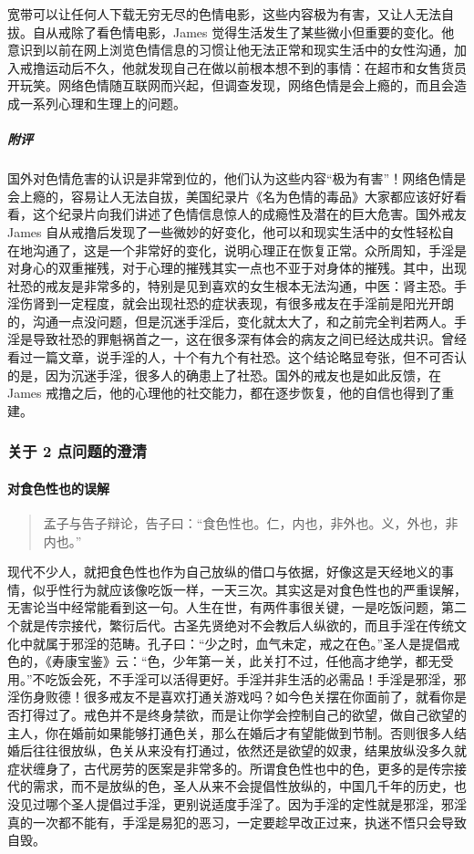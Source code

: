 \begin{case}[国外戒色网站摘录]
    宽带可以让任何人下载无穷无尽的色情电影，这些内容极为有害，又让人无法自拔。自从戒除了看色情电影，James 觉得生活发生了某些微小但重要的变化。他意识到以前在网上浏览色情信息的习惯让他无法正常和现实生活中的女性沟通，加入戒撸运动后不久，他就发现自己在做以前根本想不到的事情：在超市和女售货员开玩笑。网络色情随互联网而兴起，但调查发现，网络色情是会上瘾的，而且会造成一系列心理和生理上的问题。
    \subparagraph{附评} 国外对色情危害的认识是非常到位的，他们认为这些内容“极为有害”！网络色情是会上瘾的，容易让人无法自拔，美国纪录片《名为色情的毒品》大家都应该好好看看，这个纪录片向我们讲述了色情信息惊人的成瘾性及潜在的巨大危害。国外戒友 James 自从戒撸后发现了一些微妙的好变化，他可以和现实生活中的女性轻松自在地沟通了，这是一个非常好的变化，说明心理正在恢复正常。众所周知，手淫是对身心的双重摧残，对于心理的摧残其实一点也不亚于对身体的摧残。其中，出现社恐的戒友是非常多的，特别是见到喜欢的女生根本无法沟通，中医：肾主恐。手淫伤肾到一定程度，就会出现社恐的症状表现，有很多戒友在手淫前是阳光开朗的，沟通一点没问题，但是沉迷手淫后，变化就太大了，和之前完全判若两人。手淫是导致社恐的罪魁祸首之一，这在很多深有体会的病友之间已经达成共识。曾经看过一篇文章，说手淫的人，十个有九个有社恐。这个结论略显夸张，但不可否认的是，因为沉迷手淫，很多人的确患上了社恐。国外的戒友也是如此反馈，在 James 戒撸之后，他的心理他的社交能力，都在逐步恢复，他的自信也得到了重建。
\end{case}

\subsubsection{关于 2 点问题的澄清}

\paragraph{对食色性也的误解}

\begin{quote}
    孟子与告子辩论，告子曰：“食色性也。仁，内也，非外也。义，外也，非内也。”
\end{quote}

现代不少人，就把食色性也作为自己放纵的借口与依据，好像这是天经地义的事情，似乎性行为就应该像吃饭一样，一天三次。其实这是对食色性也的严重误解，无害论当中经常能看到这一句。人生在世，有两件事很关键，一是吃饭问题，第二个就是传宗接代，繁衍后代。古圣先贤绝对不会教后人纵欲的，而且手淫在传统文化中就属于邪淫的范畴。孔子曰：“少之时，血气未定，戒之在色。”圣人是提倡戒色的，《寿康宝鉴》云：“色，少年第一关，此关打不过，任他高才绝学，都无受用。”不吃饭会死，不手淫可以活得更好。手淫并非生活的必需品！手淫是邪淫，邪淫伤身败德！很多戒友不是喜欢打通关游戏吗？如今色关摆在你面前了，就看你是否打得过了。戒色并不是终身禁欲，而是让你学会控制自己的欲望，做自己欲望的主人，你在婚前如果能够打通色关，那么在婚后才有望能做到节制。否则很多人结婚后往往很放纵，色关从来没有打通过，依然还是欲望的奴隶，结果放纵没多久就症状缠身了，古代房劳的医案是非常多的。所谓食色性也中的色，更多的是传宗接代的需求，而不是放纵的色，圣人从来不会提倡性放纵的，中国几千年的历史，也没见过哪个圣人提倡过手淫，更别说适度手淫了。因为手淫的定性就是邪淫，邪淫真的一次都不能有，手淫是易犯的恶习，一定要趁早改正过来，执迷不悟只会导致自毁。


